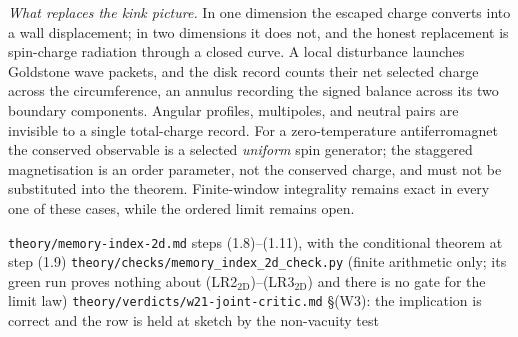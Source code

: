 \emph{What replaces the kink picture.} In one dimension the escaped charge
converts into a wall displacement; in two dimensions it does not, and the
honest replacement is spin-charge radiation through a closed curve. A local
disturbance launches Goldstone wave packets, and the disk record counts their
net selected charge across the circumference, an annulus recording the signed
balance across its two boundary components. Angular profiles, multipoles, and
neutral pairs are invisible to a single total-charge record. For a
zero-temperature antiferromagnet the conserved observable is a selected
\emph{uniform} spin generator; the staggered magnetisation is an order
parameter, not the conserved charge, and must not be substituted into the
theorem. Finite-window integrality remains exact in every one of these cases,
while the ordered limit remains open.

%
{\texttt{theory/memory-index-2d.md} steps (1.8)--(1.11), with the conditional
theorem at step (1.9)}%
{\texttt{theory/checks/memory\_index\_2d\_check.py} (finite arithmetic only;
its green run proves nothing about (LR2$_{\mathrm{2D}}$)--(LR3$_{\mathrm{2D}}$)
and there is no gate for the limit law)}%
{\texttt{theory/verdicts/w21-joint-critic.md} \S(W3): the implication is
correct and the row is held at sketch by the non-vacuity test}

